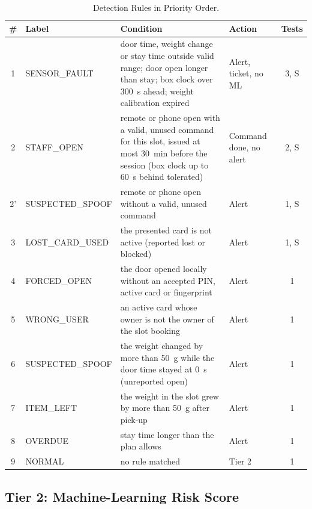 \documentclass[journal,onecolumn]{IEEEtran}
\begin{document}
\begin{table}[!htbp]
\renewcommand{\arraystretch}{1.18}
\centering
\small
\caption{Detection Rules in Priority Order.}
\label{tab:rules}
\vspace{5pt}
\begin{tabular}{c l p{8.1cm} l c}
\hline
\# & Label & Condition & Action & Tests \\
\hline
\rule{0pt}{2.6ex}1 & SENSOR\_FAULT & door time, weight change or stay time outside valid range; door open longer than stay; box clock over 300~s ahead; weight calibration expired & Alert, ticket, no ML & 3, S \\[2pt]
2 & STAFF\_OPEN & remote or phone open with a valid, unused command for this slot, issued at most 30~min before the session (box clock up to 60~s behind tolerated) & Command done, no alert & 2, S \\[2pt]
2' & SUSPECTED\_SPOOF & remote or phone open without a valid, unused command & Alert & 1, S \\[2pt]
3 & LOST\_CARD\_USED & the presented card is not active (reported lost or blocked) & Alert & 1, S \\[2pt]
4 & FORCED\_OPEN & the door opened locally without an accepted PIN, active card or fingerprint & Alert & 1 \\[2pt]
5 & WRONG\_USER & an active card whose owner is not the owner of the slot booking & Alert & 1 \\[2pt]
6 & SUSPECTED\_SPOOF & the weight changed by more than 50~g while the door time stayed at 0~s (unreported open) & Alert & 1 \\[2pt]
7 & ITEM\_LEFT & the weight in the slot grew by more than 50~g after pick-up & Alert & 1 \\[2pt]
8 & OVERDUE & stay time longer than the plan allows & Alert & 1 \\[2pt]
9 & NORMAL & no rule matched & Tier 2 & 1 \\
\hline
\end{tabular}
\end{table}

\subsection{Tier 2: Machine-Learning Risk Score}
\end{document}
